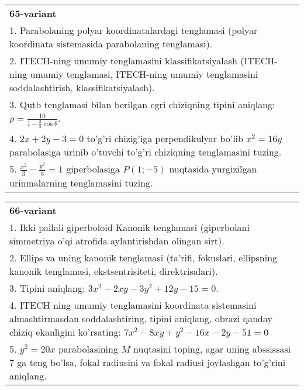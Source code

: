 \documentclass{article}
\begin{document}
\begin{tabular}{m{17cm}}
\textbf{65-variant}\\
1. Parabolaning polyar koordinatalardagi tenglamasi (polyar koordinata sistemasida parabolaning tenglamasi).\\

2. ITECH-ning umumiy tenglamasini klassifikatsiyalash (ITECH-ning umumiy tenglamasi, ITECH-ning umumiy tenglamasini soddalashtirish, klassifikatsiyalash).\\

3. Qutb tenglamasi bilan berilgan egri chiziqning tipini aniqlang: $\rho=\frac{10}{1-\frac{3}{2}\cos\theta}$.\\

4. $2x + 2y - 3 = 0$ to'g'ri chizig'iga perpendikulyar bo'lib $x^{2} = 16y$ parabolasiga urinib o'tuvchi to'g'ri chiziqning tenglamasini tuzing.  \\

5. $\frac{x^{2}}{3} - \frac{y^{2}}{5} = 1$ giperbolasiga $P(1; - 5)$ nuqtasida yurgizilgan urinmalarning tenglamasini tuzing.
\end{tabular}
\vspace{1cm}


\begin{tabular}{m{17cm}}
\textbf{66-variant}\\
1. Ikki pallali giperboloid Kanonik tenglamasi (giperbolani simmetriya o'qi atrofida aylantirishdan olingan sirt).\\

2. Ellips va uning kanonik tenglamasi (ta'rifi, fokuslari, ellipsning kanonik tenglamasi, ekstsentrisiteti, direktrisalari).\\

3. Tipini aniqlang: $3x^{2}-2xy-3y^{2}+12y-15=0$.\\

4. ITECH ning umumiy tenglamasini koordinata sistemasini almashtirmasdan soddalashtiring, tipini aniqlang, obrazi qanday chiziq ekanligini ko'rsating: $7x^{2} - 8xy + y^{2} - 16x - 2y - 51 = 0$\\

5. $y^{2} = 20x$ parabolasining $M$ nuqtasini toping, agar uning abssissasi 7 ga teng bo'lsa, fokal radiusini va fokal radiusi joylashgan to'g'rini aniqlang.
\end{tabular}
\vspace{1cm}
\end{document}
